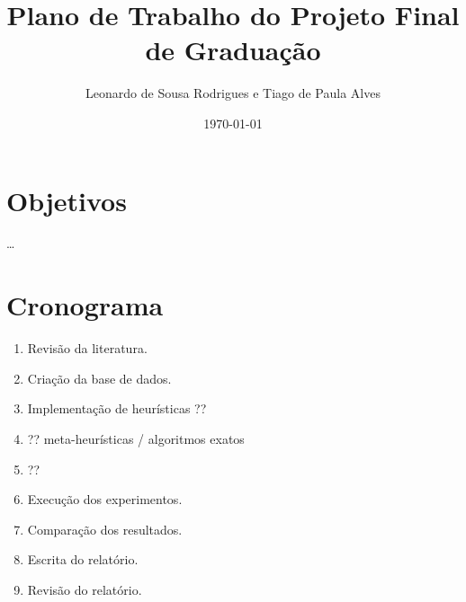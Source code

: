 \documentclass[a4paper]{article}
\title{Plano de Trabalho do Projeto Final de Graduação}
\author{Leonardo de Sousa Rodrigues e Tiago de Paula Alves}
\date{\today}
\begin{document}
    \maketitle

    \section{Objetivos}
        \ldots

    \section{Cronograma}

        \begin{enumerate}
            \item Revisão da literatura.
            \item Criação da base de dados.
            \item Implementação de heurísticas ??
            \item ?? meta-heurísticas / algoritmos exatos
            \item ??
            \item Execução dos experimentos.
            \item Comparação dos resultados.
            \item Escrita do relatório.
            \item Revisão do relatório.
        \end{enumerate}
\end{document}
